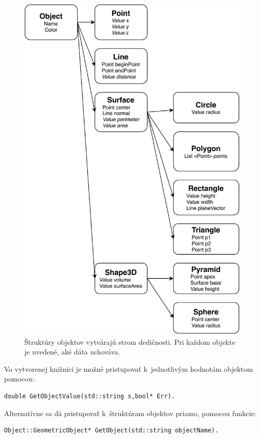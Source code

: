 \begin{figure}[]
	\centering
	\includegraphics[height=0.95\textheight]{obrazky-figures/Diagram/Draw/Parametric Sctructures Tree.pdf}
	\caption{Štruktúry objektov vytvárajú strom dedičnosti. Pri každom objekte je uvedené, aké dáta uchováva. }
	\label{fig:StromDedicnosti}
\end{figure}
Vo vytvorenej knižnici je možné pristupovať k~jednotlivým hodnotám objektom pomocou:.    
\begin{lstlisting}
double GetObjectValue(std::string s,bool* Err).
\end{lstlisting}
Alternatívne sa dá pristupovať k~štruktúram objektov priamo, pomocou funkcie: 
\begin{lstlisting}
Object::GeometricObject* GetObject(std::string objectName).
\end{lstlisting}

